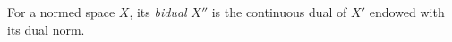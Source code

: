 
For a normed space $X$, its \emph{bidual} $X''$ is the continuous dual of $X'$ endowed with its dual norm.
